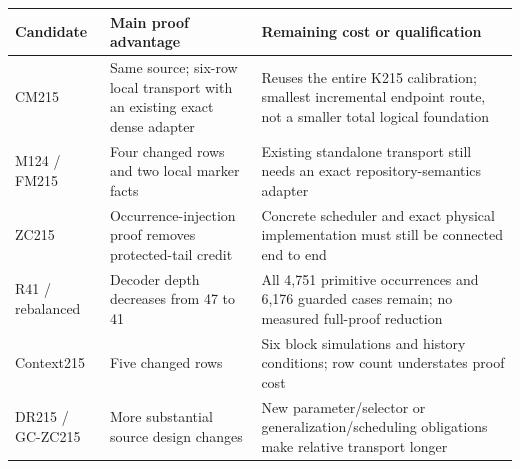 \documentclass[11pt,letterpaper]{article}
\theoremstyle{definition}\newtheorem{definition}[theorem]{Definition}
\begin{document}
\begin{center}\small
\begin{tabular}{P{0.16\textwidth}P{0.35\textwidth}P{0.39\textwidth}}
\toprule
Candidate & Main proof advantage & Remaining cost or qualification\\\midrule
CM215 & Same source; six-row local transport with an existing exact dense adapter & Reuses the entire K215 calibration; smallest incremental endpoint route, not a smaller total logical foundation\\
M124 / FM215 & Four changed rows and two local marker facts & Existing standalone transport still needs an exact repository-semantics adapter\\
ZC215 & Occurrence-injection proof removes protected-tail credit & Concrete scheduler and exact physical implementation must still be connected end to end\\
R41 / rebalanced & Decoder depth decreases from 47 to 41 & All 4,751 primitive occurrences and 6,176 guarded cases remain; no measured full-proof reduction\\
Context215 & Five changed rows & Six block simulations and history conditions; row count understates proof cost\\
DR215 / GC-ZC215 & More substantial source design changes & New parameter/selector or generalization/scheduling obligations make relative transport longer\\
\bottomrule
\end{tabular}\end{center}
\end{document}
